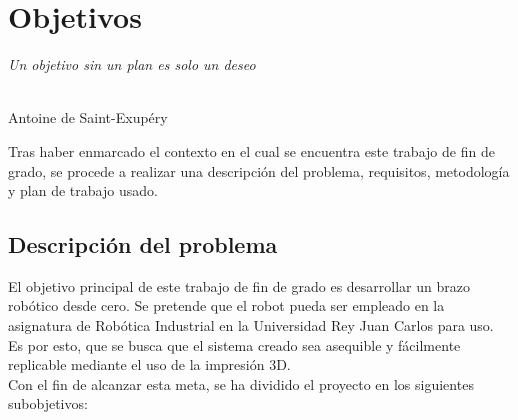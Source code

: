 \chapter{Objetivos}
\label{cap:capitulo3}

\begin{flushright}
\begin{minipage}[]{10cm}
\emph{Un objetivo sin un plan es solo un deseo}\\
\end{minipage}\\

Antoine de Saint-Exupéry\\
\end{flushright}

\vspace{1cm}

Tras haber enmarcado el contexto en el cual se encuentra este trabajo de fin de grado, se procede a realizar
una descripción del problema, requisitos, metodología y plan de trabajo usado.
\section{Descripción del problema}
\label{sec:descripcion}
El objetivo principal de este trabajo de fin de grado es desarrollar un brazo robótico desde cero. Se pretende que
el robot pueda ser empleado en la asignatura de Robótica Industrial en la Universidad Rey Juan Carlos para uso. Es por esto,
que se busca que el sistema creado sea asequible y fácilmente replicable mediante el uso de la impresión 3D.\\
Con el fin de alcanzar esta meta, se ha dividido el proyecto en los siguientes subobjetivos:

